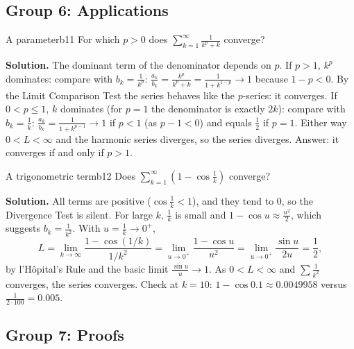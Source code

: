 \documentclass[11pt]{article}
\begin{document}
\subsection*{Group 6: Applications}

\begin{exmp}{A parameter}{b11}
For which $p>0$ does $\displaystyle\sum_{k=1}^\infty\frac1{k^p+k}$ converge?

\textbf{Solution.} The dominant term of the denominator depends on $p$. If $p>1$, $k^p$ dominates: compare with $b_k=\frac1{k^p}$: $\frac{a_k}{b_k}=\frac{k^p}{k^p+k}=\frac1{1+k^{1-p}}\to1$ because $1-p<0$. By the Limit Comparison Test the series behaves like the $p$-series: it converges. If $0<p\le1$, $k$ dominates (for $p=1$ the denominator is exactly $2k$): compare with $b_k=\frac1k$: $\frac{a_k}{b_k}=\frac1{1+k^{p-1}}\to1$ if $p<1$ (as $p-1<0$) and equals $\frac12$ if $p=1$. Either way $0<L<\infty$ and the harmonic series diverges, so the series diverges. Answer: it converges if and only if $p>1$.
\end{exmp}

\begin{exmp}{A trigonometric term}{b12}
Does $\displaystyle\sum_{k=1}^\infty\left(1-\cos\frac1k\right)$ converge?

\textbf{Solution.} All terms are positive ($\cos\frac1k<1$), and they tend to $0$, so the Divergence Test is silent. For large $k$, $\frac1k$ is small and $1-\cos u\approx\frac{u^2}2$, which suggests $b_k=\frac1{k^2}$. With $u=\frac1k\to0^+$,
\[
L=\lim_{k\to\infty}\frac{1-\cos(1/k)}{1/k^2}=\lim_{u\to0^+}\frac{1-\cos u}{u^2}=\lim_{u\to0^+}\frac{\sin u}{2u}=\frac12 ,
\]
by l'H\^opital's Rule and the basic limit $\frac{\sin u}u\to1$. As $0<L<\infty$ and $\sum\frac1{k^2}$ converges, the series converges. Check at $k=10$: $1-\cos0.1\approx0.0049958$ versus $\frac1{2\cdot100}=0.005$.
\end{exmp}

\subsection*{Group 7: Proofs}
\end{document}
